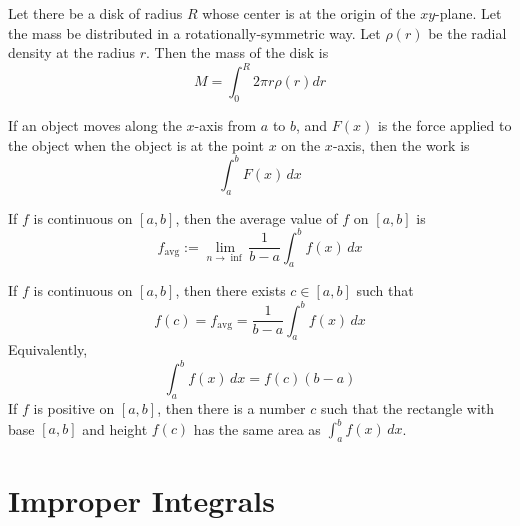 \begin{theorem}
  Let there be a disk of radius $R$ whose center is at the origin of the $xy$-plane. Let the mass be distributed in a rotationally-symmetric way. Let $\rho(r)$ be the radial density at the radius $r$. Then the mass of the disk is 
  \[
    M = \int_0^R 2\pi r \rho(r) dr
  \]
\end{theorem}

\begin{theorem}[Work]
  If an object moves along the $x$-axis from $a$ to $b$, and $F(x)$ is the force applied to the object when the object is at the point $x$ on the $x$-axis, then the work is
  \[
    \int_a^b F(x) \,dx
  \]
\end{theorem}

\begin{definition}
  If $f$ is continuous on $[a, b]$, then the average value of $f$ on $[a, b]$ is
  \[
    f_{\text{avg}} := \lim_{n \to \inf} \frac{1}{b - a} \int_a^b f(x) \,dx
  \]
\end{definition}

\begin{theorem}
  If $f$ is continuous on $[a, b]$, then there exists $c \in [a, b]$ such that
  \[
    f(c) = f_{\text{avg}} = \frac{1}{b-a} \int_a^b f(x) \,dx
  \]
  Equivalently,
  \[
    \int_a^b f(x) \,dx = f(c)(b - a)
  \]
  If $f$ is positive on $[a, b]$, then there is a number $c$ such that the rectangle with base $[a, b]$ and height $f(c)$ has the same area as $\int_a^b f(x) \,dx$.
\end{theorem}

\section{Improper Integrals}

